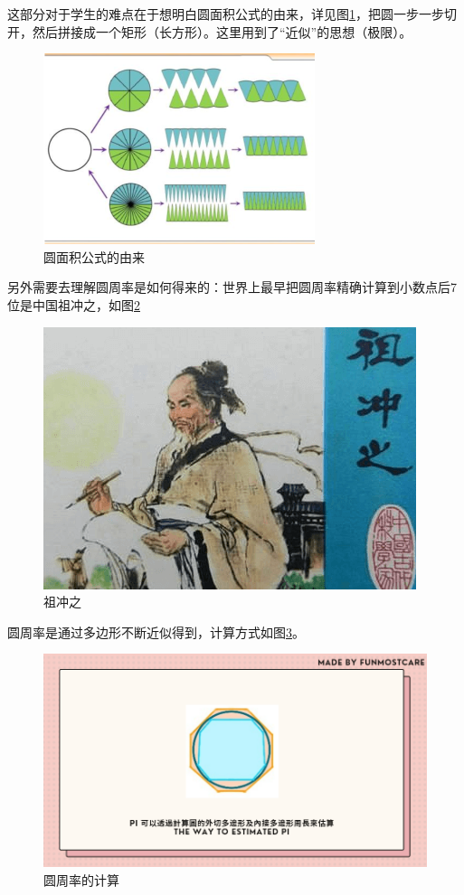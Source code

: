 \documentclass{article}
\theoremstyle{definition}
\theoremstyle{remark}
\theoremstyle{theorem}
\begin{document}
这部分对于学生的难点在于想明白圆面积公式的由来，详见图\ref{fig:circle}，把圆一步一步切开，然后拼接成一个矩形（长方形）。这里用到了“近似”的思想（极限）。
\begin{figure}
    \centering
    \includegraphics{circle.jpg}
    \caption{圆面积公式的由来}
    \label{fig:circle}
\end{figure}
另外需要去理解圆周率是如何得来的：世界上最早把圆周率精确计算到小数点后7位是中国祖冲之，如图\ref{zuchongzhi}
\begin{figure}
    \centering
    \includegraphics[scale=0.5]{zuchongzhi.jpg}
    \caption{祖冲之}
    \label{zuchongzhi}
\end{figure}
圆周率是通过多边形不断近似得到，计算方式如图\ref{pi}。
\begin{figure}
    \centering
    \includegraphics[scale=0.3]{pi-estimate.png}
    \caption{圆周率的计算}
    \label{pi}
\end{figure}
\end{document}
